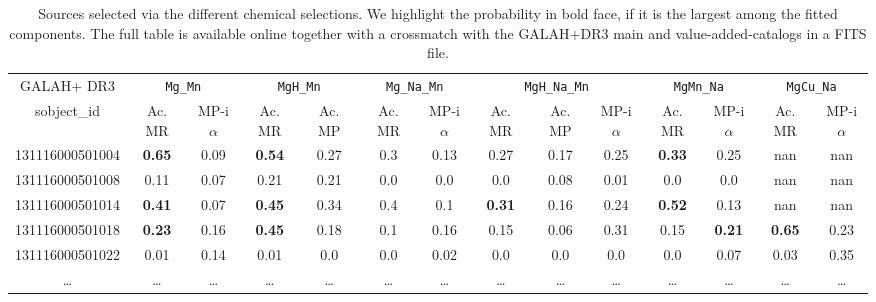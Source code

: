 \begin{table*}
\centering
\caption{Sources selected via the different chemical selections. We highlight the probability in bold face, if it is the largest among the fitted components. The full table is available online together with a crossmatch with the GALAH+DR3 main and value-added-catalogs in a FITS file.}
\label{tab:simple_gmm_selection}
\setlength{\tabcolsep}{0.6em}
\begin{tabular}{cccccccccccccc}
\hline
GALAH+ DR3 & \multicolumn{2}{c}{\texttt{Mg\_Mn}} & \multicolumn{2}{c}{\texttt{MgH\_Mn}} & \multicolumn{2}{c}{\texttt{Mg\_Na\_Mn}} & \multicolumn{3}{c}{\texttt{MgH\_Na\_Mn}} & \multicolumn{2}{c}{\texttt{MgMn\_Na}} & \multicolumn{2}{c}{\texttt{MgCu\_Na}} \\
sobject\_id & Ac. MR & MP-i$\alpha$ & Ac. MR & Ac. MP & Ac. MR & MP-i$\alpha$ & Ac. MR & Ac. MP & MP-i$\alpha$ & Ac. MR & MP-i$\alpha$ & Ac. MR & MP-i$\alpha$ \\
\hline
131116000501004 & \textbf{0.65} & 0.09 & \textbf{0.54} & 0.27 & 0.3 & 0.13 & 0.27 & 0.17 & 0.25 & \textbf{0.33} & 0.25 & nan & nan \\
131116000501008 & 0.11 & 0.07 & 0.21 & 0.21 & 0.0 & 0.0 & 0.0 & 0.08 & 0.01 & 0.0 & 0.0 & nan & nan \\
131116000501014 & \textbf{0.41} & 0.07 & \textbf{0.45} & 0.34 & 0.4 & 0.1 & \textbf{0.31} & 0.16 & 0.24 & \textbf{0.52} & 0.13 & nan & nan \\
131116000501018 & \textbf{0.23} & 0.16 & \textbf{0.45} & 0.18 & 0.1 & 0.16 & 0.15 & 0.06 & 0.31 & 0.15 & \textbf{0.21} & \textbf{0.65} & 0.23 \\
131116000501022 & 0.01 & 0.14 & 0.01 & 0.0 & 0.0 & 0.02 & 0.0 & 0.0 & 0.0 & 0.0 & 0.07 & 0.03 & 0.35 \\
\dots  & \dots  & \dots  & \dots  & \dots  & \dots  & \dots  & \dots  & \dots  & \dots  & \dots  & \dots  & \dots  & \dots \\
\hline
\end{tabular}
\end{table*}
